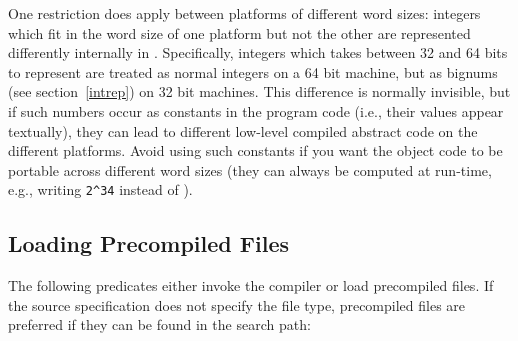 One restriction does apply between platforms of different
word sizes: integers which fit in the word size of one platform
but not the other are represented differently internally in {\eclipse}.
Specifically, integers which takes between 32 and 64
bits to represent are treated as normal integers on a 64 bit machine,
but as bignums (see section~\ref{intrep}) on 32 bit machines. This
difference is normally invisible, but if
such numbers occur as constants in the program code (i.e., their values appear
textually), they can lead to different low-level compiled abstract code on
the different platforms. Avoid using such constants if you want
the object code to be portable across different word sizes (they can always
be computed at run-time, e.g., writing \verb'2^34' instead of
).



\subsection{Loading Precompiled Files}
The following predicates either invoke the compiler or load
precompiled files.
If the source specification does not specify the file type, precompiled files
are preferred if they can be found in the search path:

